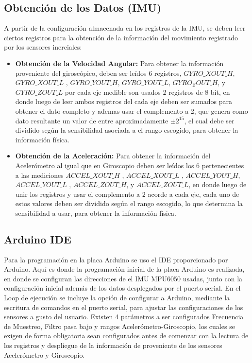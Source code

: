 \documentclass[12pt,a4paper]{article}
\begin{document}
\subsection{Obtención de los Datos (IMU)}
A partir de la configuración almacenada en los registros de la IMU,  se deben leer ciertos registros para la obtención de la información del movimiento registrado por los sensores inerciales:

\begin{itemize}
	\item \textbf{Obtención de la Velocidad Angular:} Para obtener la información proveniente del giroscópico, deben ser leídos 6 registros, $GYRO\_XOUT\_H$, $GYRO\_XOUT\_L$ , $GYRO\_YOUT\_H$, $GYRO\_YOUT\_L$, $GYRO_ZOUT\_H$, y $GYRO\_ZOUT\_L$ por cada eje medible son usados 2 registros de 8 bit, en donde luego de leer ambos registros del cada eje deben ser sumados para obtener el dato completo y ademas usar el complemento a 2, que genera como dato resultante un valor de entre aproximadamente $\pm 2^{15}$, el cual debe ser dividido según la sensibilidad asociada a el rango escogido, para obtener la información física.

\item \textbf{Obtención de la Aceleración:} Para obtener la información del  Acelerómetro al igual que en Giroscopio deben ser leídos los 6 pertenecientes a las mediciones $ACCEL\_XOUT\_H$ , $ACCEL\_XOUT\_L$ , $ACCEL\_YOUT\_H$, $ACCEL\_YOUT\_L$ , $ACCEL\_ZOUT\_H$, y $ACCEL\_ZOUT\_L$, en donde luego de unir los registros y usar el complemento a 2 acorde a cada eje, cada uno de estos valores deben ser dividido según el rango escogido, lo que determina la sensibilidad a usar, para obtener la información física.

\end{itemize}

 \subsection{Arduino IDE}
  Para la programación en la placa Arduino \cite{ARDUINO} se uso el IDE proporcionado por Arduino.
  Aquí es donde la programación inicial de la placa Arduino es realizada, en donde se configuran las direcciones de el IMU MPU6050 usadas, junto con la configuración inicial además de los datos desplegados por el puerto serial.
  En el Loop de ejecución se incluye la opción de configurar a Arduino, mediante la escritura de comandos en el puerto serial, para ajustar las configuraciones de los sensores a gusto del usuario. Existen 4 parámetros a ser configurados Frecuencia de Muestreo, Filtro pasa bajo  y rangos Acelerómetro-Giroscopio, los cuales se exigen de forma obligatoria sean configurados antes de comenzar con la lectura de los registros y despliegue de la información de proveniente de los sensores Acelerómetro y Giroscopio.
\end{document}
